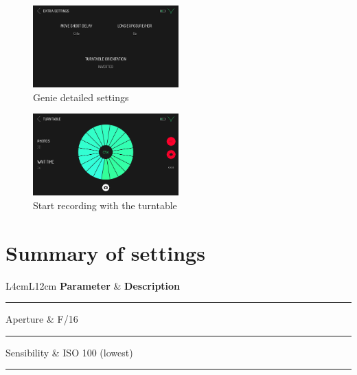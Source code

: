 \documentclass[
]{book}
\begin{document}
\hfill\break

\begin{figure}
\hypertarget{fig:genie_settings}{%
\centering
\includegraphics[width=0.5\textwidth,height=\textheight]{Figures/genie_settings.PNG}
\caption{Genie detailed
settings}\label{fig:genie_settings}
}
\end{figure}

\begin{figure}
\hypertarget{record}{%
\centering
\includegraphics[width=0.5\textwidth,height=\textheight]{Figures/genie_turntable_20_1.PNG}
\caption{Start recording with the
turntable}\label{record}
}
\end{figure}

\hypertarget{summary-of-settings}{%
\section{Summary of settings}\label{summary-of-settings}}

L4cm\textbar L12cm \textbf{Parameter} \& \textbf{Description}\\

\begin{center}\rule{0.5\linewidth}{0.5pt}\end{center}

\hfill\break
Aperture \& F/16\\

\begin{center}\rule{0.5\linewidth}{0.5pt}\end{center}

Sensibility \& ISO 100 (lowest)\\

\begin{center}\rule{0.5\linewidth}{0.5pt}\end{center}
\end{document}
